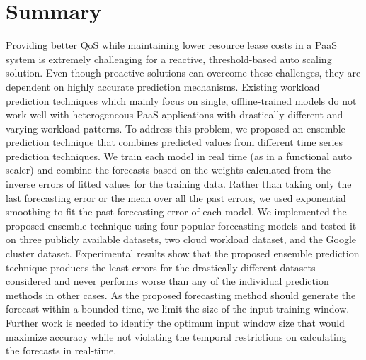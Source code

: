 \FloatBarrier
\section{Summary}

Providing better QoS while maintaining lower resource lease costs in a PaaS system is extremely challenging for a reactive, threshold-based auto scaling solution. Even though proactive solutions can overcome these challenges, they are dependent on highly accurate prediction mechanisms. Existing workload prediction techniques which mainly focus on single, offline-trained models do not work well with heterogeneous PaaS applications with drastically different and varying workload patterns. To address this problem, we proposed an ensemble prediction technique that combines predicted values from different time series prediction techniques. We train each model in real time (as in a functional auto scaler) and combine the forecasts based on the weights calculated from the inverse errors of fitted values for the training data. Rather than taking only the last forecasting error or the mean over all the past errors, we used exponential smoothing to fit the past forecasting error of each model. We implemented the proposed ensemble technique using four popular forecasting models and tested it on three publicly available datasets, two cloud workload dataset, and the Google cluster dataset. Experimental results show that the proposed ensemble prediction technique produces the least errors for the drastically different datasets considered and never performs worse than any of the individual prediction methods in other cases. As the proposed forecasting method should generate the forecast within a bounded time, we limit the size of the input training window. Further work is needed to identify the optimum input window size that would maximize accuracy while not violating the temporal restrictions on calculating the forecasts in real-time.
